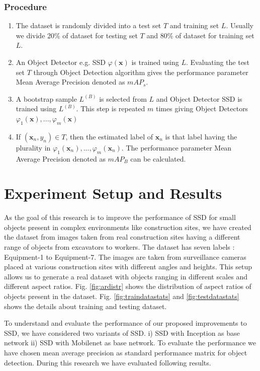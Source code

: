 \documentclass[conference]{IEEEtran}
\begin{document}
\subsubsection{Procedure}
\begin{enumerate}
\item The dataset is randomly divided into a test set $T$ and training set $L$. Usually we divide 20\% of dataset for testing set $T$ and 80\% of dataset for training set $L$. 

\item An Object Detector e.g. SSD $\varphi(\textbf{x})$ is trained using $L$. Evaluating the test set $T$ through Object Detection algorithm gives the performance parameter Mean Average Precision denoted as $mAP_s$. 

\item A bootstrap sample $L^{(B)}$ is selected from $L$ and Object Detector SSD is trained using $L^{(B)}$. This step is repeated $m$ times giving Object Detectors $\varphi_1(\textbf{x}), ... , \varphi_m(\textbf{x})$

\item If $(\textbf{x}_n, y_n) \in T$, then the estimated label of $\textbf{x}_n$ is that label having the plurality in $\varphi_1(\textbf{x}_n), ... , \varphi_m(\textbf{x}_n)$. The performance parameter Mean Average Precision denoted as $mAP_B$ can be calculated. 
\end{enumerate}

\section{Experiment Setup and Results}

As the goal of this research is to improve the performance of SSD for small objects present in complex environments like construction sites, we have created the dataset from images taken from real construction sites having a different range of objects from excavators to workers. The dataset has seven labels : Equipment-1 to Equipment-7. The images are taken from surveillance cameras placed at various construction sites with different angles and heights. This setup allows us to generate a real dataset with objects ranging in different scales and different aspect ratios. Fig. \ref{fig:ardistr} shows the distribution of aspect ratios of objects present in the dataset. Fig. \ref{fig:traindatastats} and \ref{fig:testdatastats} shows the details about training and testing dataset. 

To understand and evaluate the performance of our proposed improvements to SSD, we have considered two variants of SSD. i) SSD with Inception \cite{DBLP:journals/corr/SzegedyVISW15} as base network ii) SSD with Mobilenet \cite{DBLP:journals/corr/HowardZCKWWAA17} as base network. To evaluate the performance we have chosen mean average precision \cite{everingham2010pascal} as standard performance matrix for object detection. During this research we have evaluated following results.
\end{document}
